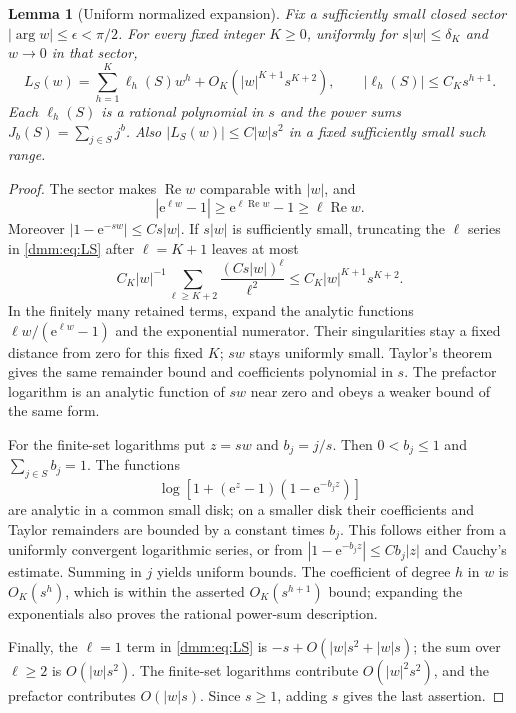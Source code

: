 \documentclass[11pt,letterpaper]{article}
\numberwithin{equation}{section}
\newtheorem{lemma}[theorem]{Lemma}
\theoremstyle{definition}\newtheorem{definition}[theorem]{Definition}
\theoremstyle{remark}\newtheorem{remark}[theorem]{Remark}
\newcommand{\ee}{\mathrm e}
\DeclareMathOperator{\Rea}{Re}
\begin{document}
\begin{lemma}[Uniform normalized expansion]\label{dmm:lem:uniformL}
Fix a sufficiently small closed sector $|\arg w|\le\epsilon<\pi/2$. For every fixed integer $K\ge0$, uniformly for $s|w|\le\delta_K$ and $w\to0$ in that sector,
\begin{equation}\label{dmm:eq:Lexpand}
L_S(w)=\sum_{h=1}^{K}\ell_h(S)w^h
+O_K(|w|^{K+1}s^{K+2}),\qquad
|\ell_h(S)|\le C_Ks^{h+1}.
\end{equation}
Each $\ell_h(S)$ is a rational polynomial in $s$ and the power sums
$J_b(S)=\sum_{j\in S}j^b$. Also $|L_S(w)|\le C|w|s^2$ in a fixed sufficiently small such range.
\end{lemma}
\begin{proof}
The sector makes $\Rea w$ comparable with $|w|$, and
\begin{equation}\label{dmm:eq:denombound}
|\ee^{\ell w}-1|\ge\ee^{\ell\Rea w}-1\ge\ell\Rea w.
\end{equation}
Moreover $|1-\ee^{-sw}|\le C s|w|$. If $s|w|$ is sufficiently small, truncating the $\ell$ series in \eqref{dmm:eq:LS} after $\ell=K+1$ leaves at most
\[
C_K|w|^{-1}\sum_{\ell\ge K+2}
\frac{(Cs|w|)^\ell}{\ell^2}
\le C_K|w|^{K+1}s^{K+2}.
\]
In the finitely many retained terms, expand the analytic functions
$\ell w/(\ee^{\ell w}-1)$ and the exponential numerator. Their singularities stay a fixed distance from zero for this fixed $K$; $sw$ stays uniformly small. Taylor's theorem gives the same remainder bound and coefficients polynomial in $s$. The prefactor logarithm is an analytic function of $sw$ near zero and obeys a weaker bound of the same form.

For the finite-set logarithms put $z=sw$ and $b_j=j/s$. Then
$0<b_j\le1$ and $\sum_{j\in S}b_j=1$. The functions
\[
\log\left[1+(\ee^z-1)(1-\ee^{-b_jz})\right]
\]
are analytic in a common small disk; on a smaller disk their coefficients and Taylor remainders are bounded by a constant times $b_j$. This follows either from a uniformly convergent logarithmic series, or from $|1-\ee^{-b_jz}|\le Cb_j|z|$ and Cauchy's estimate. Summing in $j$ yields uniform bounds. The coefficient of degree $h$ in $w$ is $O_K(s^h)$, which is within the asserted $O_K(s^{h+1})$ bound; expanding the exponentials also proves the rational power-sum description.

Finally, the $\ell=1$ term in \eqref{dmm:eq:LS} is
$-s+O(|w|s^2+|w|s)$; the sum over $\ell\ge2$ is $O(|w|s^2)$. The finite-set logarithms contribute $O(|w|^2s^2)$, and the prefactor contributes $O(|w|s)$. Since $s\ge1$, adding $s$ gives the last assertion.
\end{proof}
\end{document}
